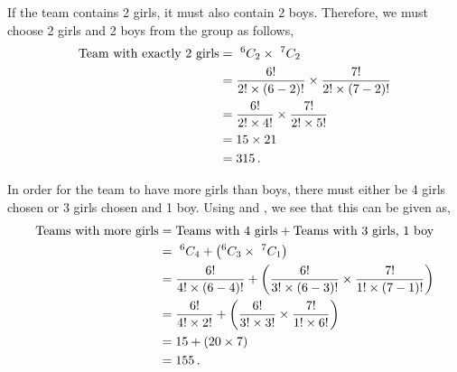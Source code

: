 \begin{subquestions}
\begin{subsubquestions}

\subsubquestion

If the team contains 2 girls, it must also contain 2 boys. Therefore, we must choose 2 girls and 2 boys from the group as follows,
\begin{align}
	\text{Team with exactly 2 girls} & = ~^6C_2 \times ~^7C_2 \nonumber \\
	                                 & = \frac{6!}{2! \times (6-2)!} \times \frac{7!}{2! \times (7-2)!} \nonumber \\
	                                 & = \frac{6!}{2! \times 4!} \times \frac{7!}{2! \times 5!} \nonumber \\
	                                 & = 15 \times 21 \nonumber \\
	                                 & = 315 \,.
\end{align}


\subsubquestion

In order for the team to have more girls than boys, there must either be 4 girls chosen or 3 girls chosen and 1 boy. Using  and , we see that this can be given as,
\begin{align}
	\text{Teams with more girls} & = \text{Teams with 4 girls} + \text{Teams with 3 girls, 1 boy} \nonumber \\
	                                       & = ~^6C_4 + \left(^6C_3 \times ~^7C_1 \right) \nonumber \\
	                                       & = \frac{6!}{4! \times (6-4)!} + \left(\frac{6!}{3! \times (6-3)!} \times \frac{7!}{1! \times (7-1)!} \right) \nonumber \\
	                                       & = \frac{6!}{4! \times 2!} + \left(\frac{6!}{3! \times 3!} \times \frac{7!}{1! \times 6!} \right) \nonumber \\
	                                       & = 15 + (20 \times 7) \nonumber \\
	                                       & = 155 \,.
\end{align}

\end{subsubquestions}



\end{subquestions}
